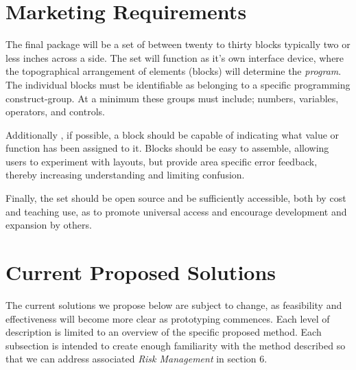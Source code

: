 \section{Marketing Requirements}


The final package will be a set of between twenty to thirty blocks typically two or less inches across a side. The set will function as it's own interface device, where the topographical arrangement of elements (blocks) will determine the \textit{program}. The individual blocks must be identifiable as belonging to a specific programming construct-group. At a minimum these groups must include; numbers, variables, operators, and controls.

Additionally , if possible, a block should be capable of indicating what  value or function has been  assigned to it. Blocks should be easy to assemble,  allowing users to experiment with layouts, but provide area specific error feedback, thereby increasing understanding and limiting confusion.

Finally, the set should be open source and be sufficiently accessible, both by cost and teaching use, as to promote universal access and encourage development and expansion by others.




\section{Current Proposed Solutions }
  The current solutions we propose below are subject to change, as feasibility and effectiveness will become more clear as prototyping commences. Each level of description is limited to an overview of the specific proposed method. Each subsection is intended to create enough familiarity with the method described so that we can address associated \textit{Risk Management} in section 6.

